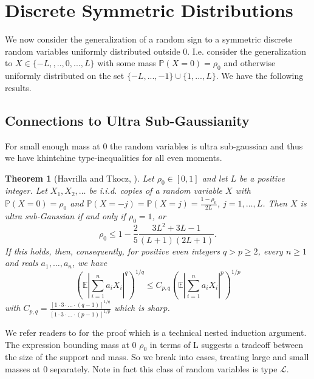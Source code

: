 \documentclass[10pt]{article}
\newcommand{\Pp}{\mathbb{P}}
\newcommand{\E}{\mathbb{E}}
\newcommand{\1}{\textbf{1}}
\newcommand{\p}[1]{\mathbb{P}\left( #1 \right)}
\newtheorem{theorem}{Theorem}[subsection]
\theoremstyle{remark}
\theoremstyle{definition}
\begin{document}
\newpage

\section{Discrete Symmetric Distributions}

We now consider the generalization of a random sign to a symmetric discrete random variables uniformly distributed outside 0. I.e. consider the generalization to $X \in \{-L,,..,0,...,L\}$ with some mass $\Pp(X = 0) = \rho_0$ and otherwise uniformly distributed on the set $\{-L,...,-1\} \cup \{1,...,L\}$. We have the following results.

\subsection{Connections to Ultra Sub-Gaussianity}

For small enough mass at 0 the random variables is ultra sub-gaussian and thus we have khintchine type-inequalities for all even moments.

\begin{theorem}[Havrilla and Tkocz, \cite{HT}]\label{thm:USG}
Let $\rho_0 \in [0,1]$ and let $L$ be a positive integer. Let $X_1, X_2,\dots$ be i.i.d. copies of a random variable $X$ with $\p{X=0} = \rho_0$ and $\p{X = -j} = \p{X = j} = \frac{1-\rho_0}{2L}$, $j = 1,\dots,L$. Then $X$ is ultra sub-Gaussian if and only if $\rho_0 = 1$, or
\begin{equation}\label{eq:USG-rho}
\rho_0 \leq 1 - \frac{2}{5}\frac{3L^2+3L-1}{(L+1)(2L+1)}.
\end{equation}
If this holds, then, consequently, for positive even integers $q > p \geq 2$, every $n \geq 1$ and reals $a_1,\dots,a_n$, we have
\begin{equation}\label{eq:Khin-even}
\left(\E\left|\sum_{i=1}^n a_iX_i\right|^q\right)^{1/q} \leq C_{p,q}\left(\E\left|\sum_{i=1}^n a_iX_i\right|^p\right)^{1/p}
\end{equation}
with $C_{p,q} = \frac{[1\cdot 3\cdot\ldots \cdot (q-1)]^{1/q}}{[1\cdot 3\cdot\ldots \cdot (p-1)]^{1/p}}$ which is sharp.
\end{theorem} We refer readers to \cite{HT} for the proof which is a technical nested induction argument. The expression bounding mass at 0 $\rho_0$ in terms of L suggests a tradeoff between the size of the support and mass. So we break into cases, treating large and small masses at 0 separately. Note in fact this class of random variables is type $\mathcal{L}$.
\end{document}
